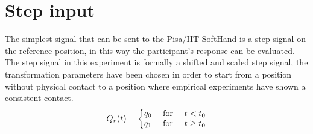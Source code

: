 \section{Step input}
The simplest signal that can be sent to the Pisa/IIT SoftHand is a step signal on the reference position, in this way the participant's response can be evaluated. The step signal in this experiment is formally a shifted and scaled step signal, the transformation parameters have been chosen in order to start from a position without physical contact to a position where empirical experiments have shown a consistent contact. 
\begin{equation}
Q_{r}(t)=\left\{\begin{matrix}
q_{0} & $ for $ & t < t_0 \\ 
q_{1} & $ for $ & t \geq t_0
\end{matrix}\right.
\label{eq:StepSignal}
\end{equation}

